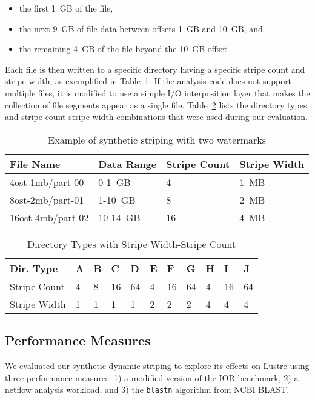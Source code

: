 \documentclass[conference,compsoc]{IEEEtran}
\begin{document}
\begin{itemize}
  \item the first 1~GB of the file,
  \item the next 9~GB of file data between offsets 1~GB and 10~GB, and
  \item the remaining 4~GB of the file beyond the 10~GB offset
\end{itemize}

Each file is then written to a specific directory having a specific stripe count and stripe width, as exemplified in Table~\ref{tab:synthetic_striping}.
If the analysis code does not support multiple files, it is modified to use a simple I/O interposition layer that makes the collection of file segments appear as a single file.
Table~\ref{tab:directory_types} lists the directory types and stripe count-stripe width combinations that were used during our evaluation.

\begin{table}[t]
\centering
\caption{Example of synthetic striping with two watermarks}
\label{tab:synthetic_striping}
\begin{tabular}{llll}
File Name & Data Range & Stripe Count & Stripe Width \\
\hline
4ost-1mb/part-00 & 0-1~GB & 4 & 1~MB \\
8ost-2mb/part-01 & 1-10~GB & 8 & 2~MB \\
16ost-4mb/part-02 & 10-14~GB & 16 & 4~MB
\end{tabular}
\end{table}

\begin{table}[t]
\centering
\caption{Directory Types with Stripe Width-Stripe Count}
\label{tab:directory_types}
\begin{tabular}{l||llllllllll}
Dir. Type & A & B & C  & D  & E & F  & G  & H & I  & J  \\
\hline
Stripe Count   & 4 & 8 & 16 & 64 & 4 & 16 & 64 & 4 & 16 & 64 \\
Stripe Width   & 1 & 1 & 1  & 1  & 2 & 2  & 2  & 4 & 4  & 4  \\
\end{tabular}
\end{table}

\subsection{Performance Measures}

We evaluated our synthetic dynamic striping to explore its effects on Lustre using three performance measures: 1) a modified version of the IOR benchmark, 2) a netflow analysis workload, and 3) the \texttt{blastn} algorithm from NCBI BLAST.
\end{document}
